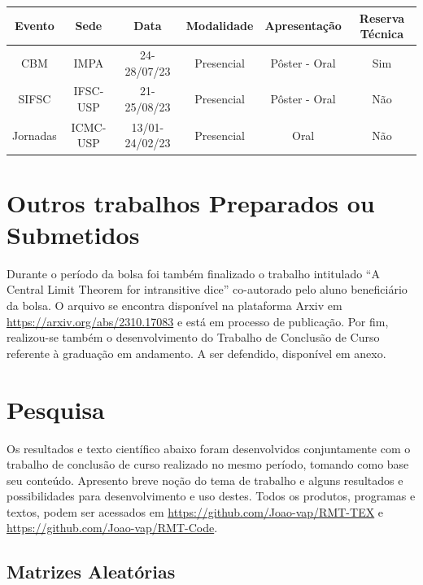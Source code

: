 \documentclass[12pt]{report}
\begin{document}
\hspace{1cm}

\begin{center}
\begin{tabular}{|c|c|c|c|c|c|}
	\hline
	Evento &  Sede & Data & Modalidade & Apresentação & Reserva Técnica \\
	\hline
	CBM & IMPA & 24-28/07/23 & Presencial & Pôster - Oral & Sim \\
	\hline
	SIFSC & IFSC-USP & 21-25/08/23 & Presencial & Pôster - Oral & Não \\
	\hline
	Jornadas & ICMC-USP & 13/01-24/02/23 & Presencial & Oral & Não \\
	\hline
\end{tabular}
\end{center}



\section{Outros trabalhos Preparados ou Submetidos}

Durante o período da bolsa foi também finalizado o trabalho intitulado ``A Central Limit Theorem for intransitive dice'' co-autorado pelo aluno beneficiário da bolsa. O arquivo se encontra disponível
na plataforma Arxiv em \url{https://arxiv.org/abs/2310.17083} e está em processo de publicação. Por fim, realizou-se também o desenvolvimento do Trabalho de Conclusão de Curso referente à graduação em andamento. A ser defendido, disponível em anexo.

\section{Pesquisa}
\label{Pesquisa}

Os resultados e texto científico abaixo foram desenvolvidos conjuntamente com o trabalho de conclusão de curso realizado no mesmo período, tomando como base seu conteúdo. Apresento breve noção do tema de trabalho e alguns resultados e possibilidades para desenvolvimento e uso destes. Todos os produtos, programas e textos, podem ser acessados em \url{https://github.com/Joao-vap/RMT-TEX} e \url{https://github.com/Joao-vap/RMT-Code}.

\subsection{Matrizes Aleatórias}
\label{Section: Matrizes}
\end{document}
